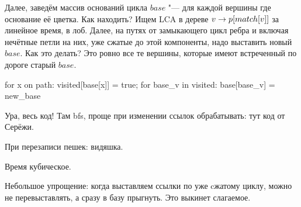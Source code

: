 Далее, заведём массив оснований цикла $base$ "--- для каждой вершины где основание её цветка.
Как находить? Ищем LCA в дереве $v \rightarrow p[match[v]]$ за линейное время, в лоб.
Далее, на путях от замыкающего цикл ребра и включая нечётные петли на них, уже сжатые до этой компоненты, надо выставить новый $base$.
Как это делать? Это ровно все те вершины, которые имеют встреченный по дороге старый $base$.
\begin{abstractcode}
for x on path:
	visited[base[x]] = true;
for base_v in visited:
	base[base_v] = new_base
\end{abstractcode}

Ура, весь код! Там bfs, проще при изменении ссылок обрабатывать: тут код от Серёжи.

При перезаписи пешек: видяшка.

Время кубическое.

Небольшое упрощение: когда выставляем ссылки по уже cжатому циклу, можно не перевыставлять, а сразу в базу прыгнуть.
Это выкинет слагаемое.
